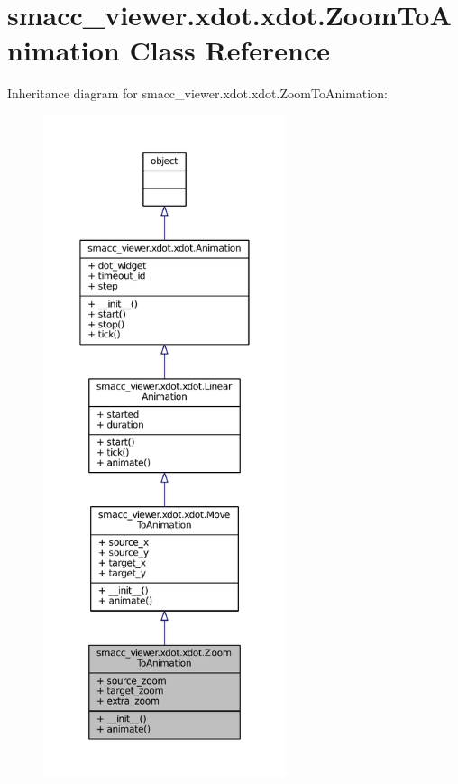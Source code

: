 \hypertarget{classsmacc__viewer_1_1xdot_1_1xdot_1_1ZoomToAnimation}{}\section{smacc\+\_\+viewer.\+xdot.\+xdot.\+Zoom\+To\+Animation Class Reference}
\label{classsmacc__viewer_1_1xdot_1_1xdot_1_1ZoomToAnimation}


Inheritance diagram for smacc\+\_\+viewer.\+xdot.\+xdot.\+Zoom\+To\+Animation\+:
\nopagebreak
\begin{figure}[H]
\begin{center}
\leavevmode
\includegraphics[height=550pt]{classsmacc__viewer_1_1xdot_1_1xdot_1_1ZoomToAnimation__inherit__graph}
\end{center}
\end{figure}


